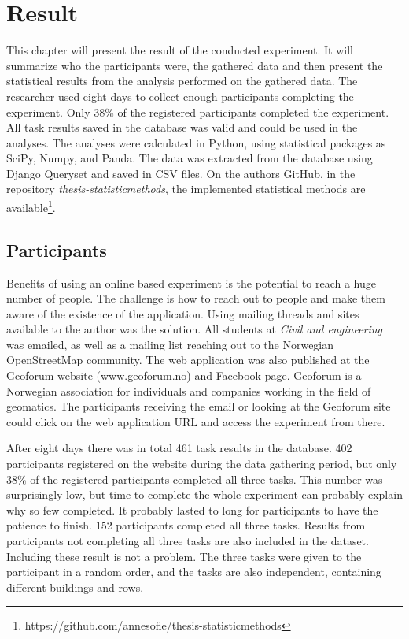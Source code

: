 \chapter{Result}
This chapter will present the result of the conducted experiment. It will summarize who the participants were, the gathered data and then present the statistical results from the analysis performed on the gathered data. The researcher used eight days to collect enough participants completing the experiment. Only 38\% of the registered participants completed the experiment. All task results saved in the database was valid and could be used in the analyses. The analyses were calculated in Python, using statistical packages as SciPy, Numpy, and Panda. The data was extracted from the database using Django Queryset and saved in CSV files. On the authors GitHub, in the repository \textit{thesis-statisticmethods}, the implemented statistical methods are available\footnote{https://github.com/annesofie/thesis-statisticmethods}. 

\section{Participants}
Benefits of using an online based experiment is the potential to reach a huge number of people. The challenge is how to reach out to people and make them aware of the existence of the application. Using mailing threads and sites available to the author was the solution. All students at \textit{Civil and engineering} was emailed, as well as a mailing list reaching out to the Norwegian OpenStreetMap community. The web application was also published at the Geoforum website (www.geoforum.no) and Facebook page. Geoforum is a Norwegian association for individuals and companies working in the field of geomatics. The participants receiving the email or looking at the Geoforum site could click on the web application URL and access the experiment from there. 

After eight days there was in total 461 task results in the database. 402 participants registered on the website during the data gathering period, but only 38\% of the registered participants completed all three tasks. This number was surprisingly low, but time to complete the whole experiment can probably explain why so few completed. It probably lasted to long for participants to have the patience to finish. 152 participants completed all three tasks. Results from participants not completing all three tasks are also included in the dataset. Including these result is not a problem. The three tasks were given to the participant in a random order, and the tasks are also independent, containing different buildings and rows. %

